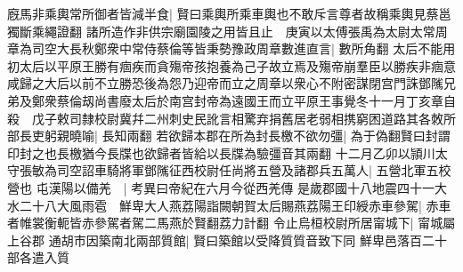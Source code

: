 廐馬非乘輿常所御者皆減半食|{
	賢曰乘輿所乘車輿也不敢斥言尊者故稱乘輿見蔡邕獨斷乘繩證翻}
諸所造作非供宗廟園陵之用皆且止　庚寅以太傅張禹為太尉太常周章為司空大長秋鄭衆中常侍蔡倫等皆秉勢豫政周章數進直言|{
	數所角翻}
太后不能用初太后以平原王勝有痼疾而貪殤帝孩抱養為己子故立焉及殤帝崩羣臣以勝疾非痼意咸歸之大后以前不立勝恐後為怨乃迎帝而立之周章以衆心不附密謀閉宫門誅鄧隲兄弟及鄭衆蔡倫刼尚書廢太后於南宫封帝為遠國王而立平原王事覺冬十一月丁亥章自殺　戊子敕司隸校尉冀幷二州刺史民訛言相驚弃捐舊居老弱相携窮困道路其各敇所部長吏躬親曉喻|{
	長知兩翻}
若欲歸本郡在所為封長檄不欲勿彊|{
	為于偽翻賢曰封謂印封之也長檄猶今長牒也欲歸者皆給以長牒為驗彊音其兩翻}
十二月乙卯以頴川太守張敏為司空詔車騎將軍鄧隲征西校尉任尚將五營及諸郡兵五萬人|{
	五營北軍五校營也}
屯漢陽以備羌　|{
	考異曰帝紀在六月今從西羌傳}
是歲郡國十八地震四十一大水二十八大風雨雹　鮮卑大人燕荔陽詣闕朝賀太后賜燕荔陽王印綬赤車參駕|{
	赤車者帷裳衡軛皆赤參駕者駕二馬燕於賢翻荔力計翻}
令止烏桓校尉所居甯城下|{
	甯城屬上谷郡}
通胡市因築南北兩部質館|{
	賢曰築館以受降質質音致下同}
鮮卑邑落百二十部各遣入質

